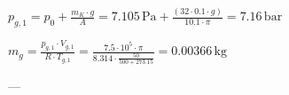 \( p_{g,1} = p_{0} + \frac{m_{K} \cdot g}{A} = 7.105 \, \text{Pa} + \frac{(32 \cdot 0.1 \cdot g)}{10.1 \cdot \pi} = 7.16 \, \text{bar} \)  

\( m_{g} = \frac{p_{g,1} \cdot V_{g,1}}{R \cdot T_{g,1}} = \frac{7.5 \cdot 10^{5} \cdot \pi}{8.314 \cdot \frac{50}{500 + 273.15}} = 0.00366 \, \text{kg} \)  

---
